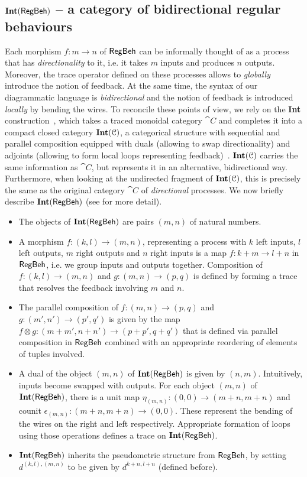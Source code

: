 \subsection{$\mathbf{Int}(\mathsf{RegBeh})$ -- a category of bidirectional regular behaviours}
 Each morphism $f \colon m \to n$ of $\mathsf{RegBeh}$ can be informally thought of as a process that has \emph{directionality} to it, i.e. it takes $m$ inputs and produces $n$ outputs. Moreover, the trace operator defined on these processes allows to \emph{globally} introduce the notion of feedback. At the same time, the syntax of our diagrammatic language is \emph{bidirectional} and the notion of feedback is introduced \emph{locally} by bending the wires. To reconcile these points of view, we rely on the \textbf{Int} construction~\cite{Joyal:1996:Traced}, which takes a traced monoidal category $\cat{C}$ and completes it into a compact closed category $\mathbf{Int}(\mathcal{C})$, a categorical structure with sequential and parallel composition equipped with duals (allowing to swap directionality) and adjoints (allowing to form local loops representing feedback)~\cite{kellylaplaza}. $\mathbf{Int}(\mathcal{C})$ carries the same information as $\cat{C}$, but represents it in an alternative, bidirectional way. Furthermore, when looking at the undirected fragment of $\mathbf{Int}(\mathcal{C})$, this is precisely the same as the original category $\cat{C}$ of \emph{directional} processes. We now briefly describe $\mathbf{Int}(\mathsf{RegBeh})$ (see  for more detail). 
	\begin{itemize}
		\item The objects of $\mathbf{Int}(\mathsf{RegBeh})$ are pairs $(m,n)$ of natural numbers. 
		\item A morphism $f \colon (k,l) \to (m,n)$, representing a process with $k$ left inputs, $l$ left outputs, $m$ right outputs and $n$ right inputs is a map $f \colon k + m \to l + n$ in $\mathsf{RegBeh}$, i.e. we group inputs and outputs together. Composition of $f \colon (k,l) \to (m,n)$ and $g \colon (m,n) \to (p,q)$ is defined by forming a trace that resolves the feedback involving $m$ and $n$.
		\item The parallel composition of $f \colon (m,n) \to (p,q)$ and $g \colon (m',n') \to (p',q')$ is given by the map $f \otimes g \colon (m + m', n + n') \to (p + p', q + q')$ that is defined via parallel composition in $\mathsf{RegBeh}$ combined with an appropriate reordering of elements of tuples involved.
		\item A dual of the object $(m,n)$ of $\mathbf{Int}(\mathsf{RegBeh})$ is given by $(n,m)$. Intuitively, inputs become swapped with outputs. For each object $(m,n)$ of $\mathbf{Int}(\mathsf{RegBeh})$, there is a unit map $\eta_{(m,n)} \colon (0,0) \to (m+n, m+n)$ and counit $\epsilon_{(m,n)} \colon (m+n, m+n) \to (0,0)$. These represent the bending of the wires on the right and left respectively. Appropriate formation of loops using those operations defines a trace on $\mathbf{Int}(\mathsf{RegBeh})$.
		\item $\mathbf{Int}(\mathsf{RegBeh})$ inherits the pseudometric structure from $\mathsf{RegBeh}$, by setting $d^{(k,l),(m,n)}$ to be given by $d^{k + n, l +n}$ (defined before).
	\end{itemize}
